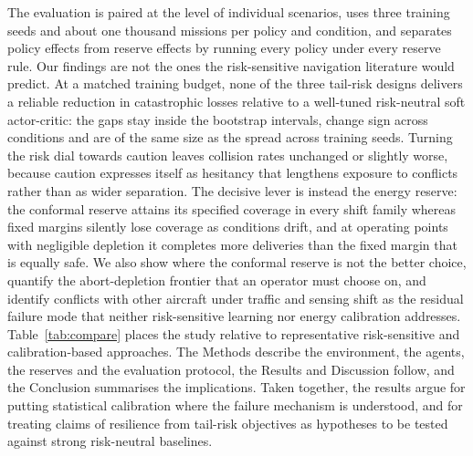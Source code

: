 The evaluation is paired at the level of individual scenarios, uses three training seeds and about one thousand missions per policy and condition, and separates policy effects from reserve effects by running every policy under every reserve rule. Our findings are not the ones the risk-sensitive navigation literature would predict. At a matched training budget, none of the three tail-risk designs delivers a reliable reduction in catastrophic losses relative to a well-tuned risk-neutral soft actor-critic: the gaps stay inside the bootstrap intervals, change sign across conditions and are of the same size as the spread across training seeds. Turning the risk dial towards caution leaves collision rates unchanged or slightly worse, because caution expresses itself as hesitancy that lengthens exposure to conflicts rather than as wider separation. The decisive lever is instead the energy reserve: the conformal reserve attains its specified coverage in every shift family whereas fixed margins silently lose coverage as conditions drift, and at operating points with negligible depletion it completes more deliveries than the fixed margin that is equally safe. We also show where the conformal reserve is not the better choice, quantify the abort-depletion frontier that an operator must choose on, and identify conflicts with other aircraft under traffic and sensing shift as the residual failure mode that neither risk-sensitive learning nor energy calibration addresses. Table~\ref{tab:compare} places the study relative to representative risk-sensitive and calibration-based approaches. The Methods describe the environment, the agents, the reserves and the evaluation protocol, the Results and Discussion follow, and the Conclusion summarises the implications. Taken together, the results argue for putting statistical calibration where the failure mechanism is understood, and for treating claims of resilience from tail-risk objectives as hypotheses to be tested against strong risk-neutral baselines.
